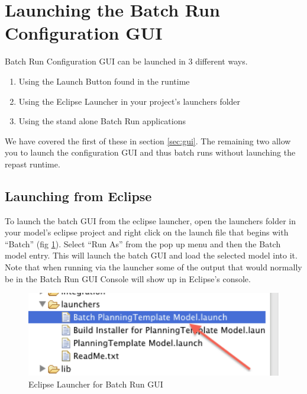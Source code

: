 \documentclass[11pt]{amsart}
\begin{document}
\label{sec:gui_launch}
\section{Launching the Batch Run Configuration GUI} 
Batch Run Configuration GUI can be launched in 3 different ways. 

\begin{enumerate}
\item Using the Launch Button found in the runtime
\item Using the Eclipse Launcher in your project's launchers folder
\item Using the stand alone Batch Run applications
\end{enumerate}
\noindent
We have covered the first of these in section \ref{sec:gui}. The remaining two allow you to launch the configuration GUI and thus batch runs without launching the repast runtime. 

\subsection{Launching from Eclipse}
To launch the batch GUI from the eclipse launcher, open the launchers folder in your model's eclipse project and right click on the launch file that begins with ``Batch'' (fig \ref{fig:launcher}). Select ``Run As'' from the pop up menu and then the Batch model entry. This will launch the batch GUI and load the selected model into it. Note that when running via the launcher some of the output that would normally be in the Batch Run GUI Console will show up in Eclipse's console.

\begin{figure}[h]
\begin{center}
\vspace{.2in}
\centerline {
\includegraphics[width=6in]{images/batch_run_launcher.png}
}
\caption{Eclipse Launcher for Batch Run GUI}
\label{fig:launcher}
\end{center}
\end{figure}
\end{document}
